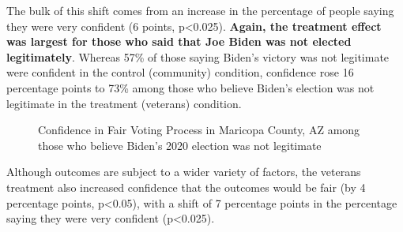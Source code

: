 \documentclass[
  11pt,
  a4paper,
]{article}
\begin{document}
The bulk of this shift comes from an increase in the percentage of
people saying they were very confident (6 points, p\textless0.025).
\textbf{Again, the treatment effect was largest for those who said that
Joe Biden was not elected legitimately}. Whereas 57\% of those saying
Biden's victory was not legitimate were confident in the control
(community) condition, confidence rose 16 percentage points to 73\%
among those who believe Biden's election was not legitimate in the
treatment (veterans) condition.

\begin{figure}

\caption{\label{fig-q22-legit}Confidence in Fair Voting Process in
Maricopa County, AZ among those who believe Biden's 2020 election was
not legitimate}


\end{figure}%

Although outcomes are subject to a wider variety of factors, the
veterans treatment also increased confidence that the outcomes would be
fair (by 4 percentage points, p\textless0.05), with a shift of 7
percentage points in the percentage saying they were very confident
(p\textless0.025).
\end{document}
